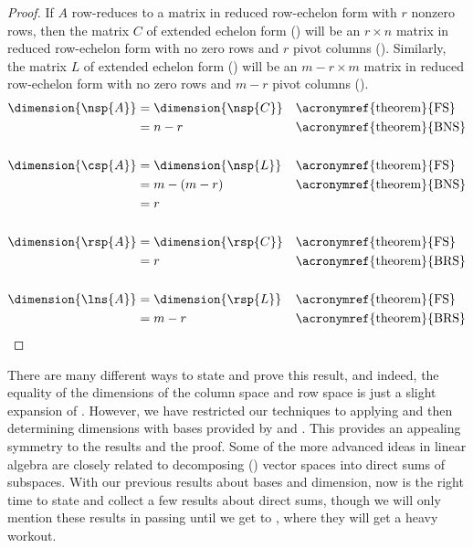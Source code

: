 %
\begin{proof}
If $A$ row-reduces to a matrix in reduced row-echelon form with $r$ nonzero rows, then the matrix $C$ of extended echelon form () will be an $r\times n$ matrix in reduced row-echelon form with no zero rows and $r$ pivot columns ().  Similarly, the matrix $L$ of extended echelon form () will be an $m-r\times m$ matrix in reduced row-echelon form with no zero rows and $m-r$ pivot columns ().
%
\begin{align*}
%
\dimension{\nsp{A}}
&=\dimension{\nsp{C}}&&\text{\acronymref{theorem}{FS}}\\
&=n-r&&\text{\acronymref{theorem}{BNS}}\\
\ \\
\dimension{\csp{A}}
&=\dimension{\nsp{L}}&&\text{\acronymref{theorem}{FS}}\\
&=m-(m-r)&&\text{\acronymref{theorem}{BNS}}\\
&=r\\
\ \\
\dimension{\rsp{A}}
&=\dimension{\rsp{C}}&&\text{\acronymref{theorem}{FS}}\\
&=r&&\text{\acronymref{theorem}{BRS}}\\
\ \\
\dimension{\lns{A}}
&=\dimension{\rsp{L}}&&\text{\acronymref{theorem}{FS}}\\
&=m-r&&\text{\acronymref{theorem}{BRS}}\\
\end{align*}
%
\end{proof}
%
There are many different ways to state and prove this result, and indeed, the equality of the dimensions of the column space and row space is just a slight expansion of .  However, we have restricted our techniques to applying  and then determining dimensions with bases provided by  and .  This provides an appealing symmetry to the results and the proof.
%
%
%
Some of the more advanced ideas in linear algebra are closely related to decomposing () vector spaces into direct sums of subspaces.  With our previous results about bases and dimension, now is the right time to state and collect a few results about direct sums, though we will only mention these results in passing until we get to , where they will get a heavy workout.\par
